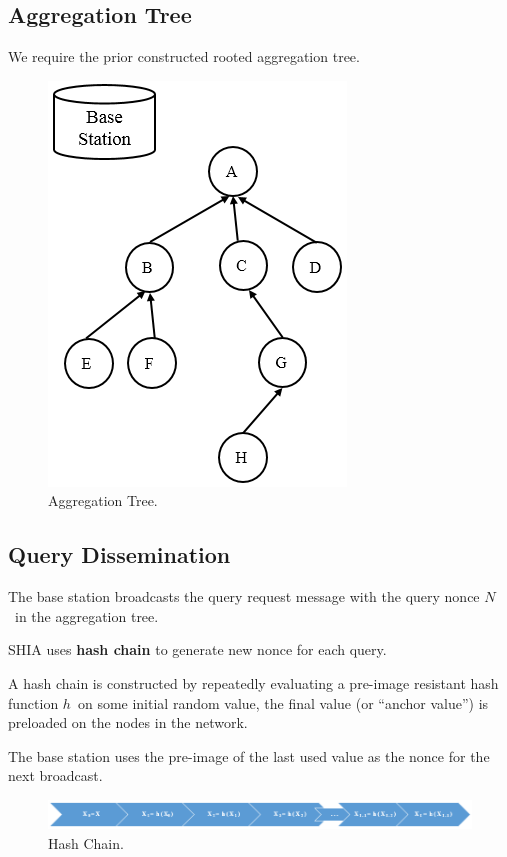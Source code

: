 \documentclass[%
  slidesonly,%
  semlayer%
  ]{seminar}                                  %
\begin{document}
\begin{slide}
    \subsection*{Aggregation Tree}
      We require the prior constructed rooted aggregation tree.
      \begin{figure}[h!]
        \centering
        \includegraphics[scale=0.4]{images/aggregation-tree-1.png}
        \caption{Aggregation Tree.}
        \label{fig:Aggregation-tree-1}
      \end{figure}
      \clearpage

    \subsection*{Query Dissemination}
      The base station broadcasts the query request message with the query nonce $N$\ in the aggregation tree. 
    
      SHIA uses \textbf{hash chain} to generate new nonce for each query. 
      
      A hash chain is constructed by repeatedly evaluating a pre-image resistant hash function $h$\ on some initial random value, the final value (or ``anchor value'') is preloaded on the nodes in the network.
      
      The base station uses the pre-image of the last used value as the nonce for the next broadcast.
      
      \begin{figure}[h!]
        \centering
        \includegraphics[scale=0.4]{images/hash-chain.png}
        \caption{Hash Chain.}
        \label{fig:hash-chain}
      \end{figure}


\end{slide}
\end{document}
